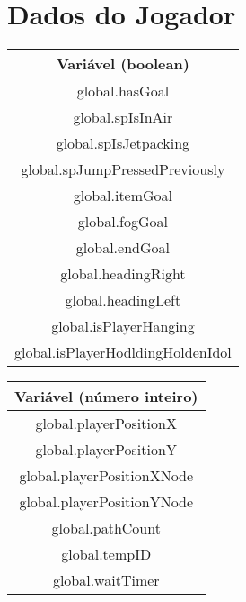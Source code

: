 \section{Dados do Jogador}

\begin{center}
    \begin{tabular}{ |c| }
        \hline
        \textbf{Variável (boolean)} \\ \hline
        global.hasGoal \\ \hline
        global.spIsInAir \\ \hline
        global.spIsJetpacking \\ \hline
        global.spJumpPressedPreviously \\ \hline
        global.itemGoal \\ \hline
        global.fogGoal \\ \hline
        global.endGoal \\ \hline
        global.headingRight \\ \hline
        global.headingLeft \\ \hline
        global.isPlayerHanging \\ \hline
        global.isPlayerHodldingHoldenIdol \\ \hline
    \end{tabular}
\end{center}

\begin{center}
    \begin{tabular}{ |c| }
        \hline
        \textbf{Variável (número inteiro)} \\ \hline
        global.playerPositionX \\ \hline
        global.playerPositionY \\ \hline
        global.playerPositionXNode \\ \hline
        global.playerPositionYNode \\ \hline
        global.pathCount \\ \hline
        global.tempID \\ \hline
        global.waitTimer \\ \hline
    \end{tabular}
\end{center}
